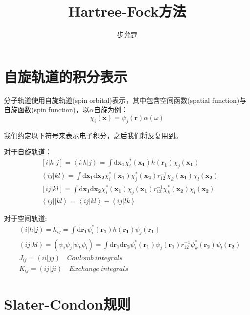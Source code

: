 \documentclass[]{article}
\title{Hartree-Fock方法}
\author{步允霆}
\begin{document}
	
	\maketitle
	
\section{自旋轨道的积分表示}
分子轨道使用自旋轨道(spin orbital)表示，其中包含空间函数(spatial function)与自旋函数(spin function)，以$\alpha$自旋为例：
\begin{equation}
	\chi_i(\mathbf{x})=\psi_j(\mathbf{r})\alpha(\omega)
\end{equation}

我们约定以下符号来表示电子积分，之后我们将反复用到。

对于自旋轨道：
\begin{align}
	&[i|h|j] = \left\langle i|h|j\right\rangle  = \int \mathrm{d}\mathbf{x_1}\chi_i^*(\mathbf{x_1}) h(\mathbf{r_1})\chi_j(\mathbf{x_1})\\
	&\left\langle ij|kl\right\rangle = \int \mathrm{d}\mathbf{x_1}\mathrm{d}\mathbf{x_2}\chi_i^*(\mathbf{x_1})\chi_j^*(\mathbf{x_2})r_{12}^{-1}\chi_k(\mathbf{x_1})\chi_l(\mathbf{x_2}) \\
	&[ij|kl]= \int \mathrm{d}\mathbf{x_1}\mathrm{d}\mathbf{x_2}\chi_i^*(\mathbf{x_1})\chi_j(\mathbf{x_1})r_{12}^{-1}\chi_k^*(\mathbf{x_2})\chi_l(\mathbf{x_2})\\
	&\left\langle ij||kl \right\rangle = \left\langle ij|kl\right\rangle -\left\langle ij|lk \right\rangle
\end{align}

对于空间轨道:
\begin{align}
	&(i|h|j)=h_{ij}=\int \mathrm{d}\mathbf{r_1}\psi_i^*(\mathbf{r_1}) h(\mathbf{r_1})\psi_j(\mathbf{r_1})\\
	&(ij|kl)=(\psi_i\psi_j|\psi_k\psi_l)=\int \mathrm{d}\mathbf{r_1}\mathrm{d}\mathbf{r_2}\psi_i^*(\mathbf{r_1})\psi_j(\mathbf{r_1})r_{12}^{-1}\psi_k^*(\mathbf{r_2})\psi_l(\mathbf{r_2})\\
	&J_{ij}=(ii|jj)\quad Coulomb\ integrals\\
	&K_{ij}=(ij|ji)\quad Exchange\ integrals
\end{align}

\section{Slater-Condon规则}
\end{document}
